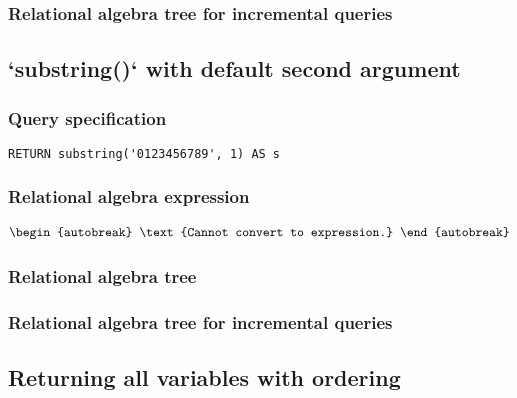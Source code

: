 
\subsubsection*{Relational algebra tree for incremental queries}


\subsection{`substring()` with default second argument}

\subsubsection*{Query specification}

\begin{lstlisting}
RETURN substring('0123456789', 1) AS s
\end{lstlisting}

\subsubsection*{Relational algebra expression}

\begin{align*}
\begin{autobreak}
\text{Cannot convert to expression.}
\end{autobreak}
\end{align*}

\subsubsection*{Relational algebra tree}


\subsubsection*{Relational algebra tree for incremental queries}


\subsection{Returning all variables with ordering}

